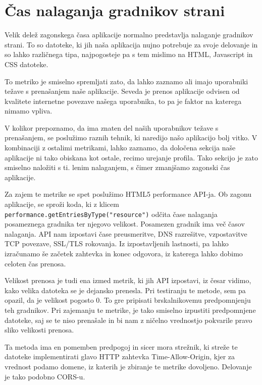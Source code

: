 \documentclass[a4paper, 12pt]{book}
\begin{document}
\section{Čas nalaganja gradnikov strani}
\label{ch2:sec3}

Velik delež zagonskega časa aplikacije normalno predstavlja nalaganje gradnikov strani. To so datoteke, ki jih naša aplikacija nujno potrebuje za svoje delovanje in so lahko različnega tipa, najpogosteje pa s tem mislimo na HTML, Javascript in CSS datoteke.

To metriko je smiselno spremljati zato, da lahko zaznamo ali imajo uporabniki težave s prenašanjem naše aplikacije. Seveda je prenos aplikacije odvisen od kvalitete internetne povezave našega uporabnika, to pa je faktor na katerega nimamo vpliva.

V kolikor prepoznamo, da ima znaten del naših uporabnikov težave s prenašanjem, se poslužimo raznih tehnik, ki naredijo našo aplikacijo bolj vitko. V kombinaciji z ostalimi metrikami, lahko zaznamo, da določena sekcija naše aplikacije ni tako obiskana kot ostale, recimo urejanje profila. Tako sekcijo je zato smiselno naložiti s ti. lenim nalaganjem, s čimer zmanjšamo zagonski čas aplikacije.

Za zajem te metrike se spet poslužimo HTML5 performance API-ja. Ob zagonu aplikacije, se sproži koda, ki z klicem \\ \verb|performance.getEntriesByType("resource")| odčita čase nalaganja posameznega gradnika ter njegovo velikost. Posamezen gradnik ima več časov nalaganja. API nam izpostavi čase preusmeritve, DNS razrešitve, vzpostavitve TCP povezave, SSL/TLS rokovanja. Iz izpostavljenih lastnosti, pa lahko izračunamo še začetek zahtevka in konec odgovora, iz katerega lahko dobimo celoten čas prenosa.

Velikost prenosa je tudi ena izmed metrik, ki jih API izpostavi, iz česar vidimo, kako velika datoteka se je dejansko prenesla. Pri testiranju te metode, sem pa opazil, da je velikost pogosto 0. To gre pripisati brskalnikovemu predpomnjenju teh gradnikov. Pri zajemanju te metrike, je tako smiselno izpustiti predpomnjene datoteke, saj se te niso prenašale in bi nam z ničelno vrednostjo pokvarile pravo sliko velikosti prenosa.

Ta metoda ima en pomemben predpogoj in sicer mora strežnik, ki streže te datoteke implementirati glavo HTTP zahtevka Time-Allow-Origin, kjer za vrednost podamo domene, iz katerih je zbiranje te metrike dovoljeno. Delovanje je tako podobno CORS-u.
\end{document}
